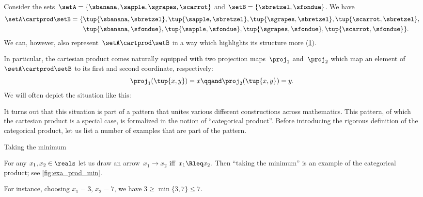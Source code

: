 \begin{example}
	Consider the sets~$\setA = \{\sbanana, \sapple, \sgrapes, \scarrot\}$ and $\setB = \{ \sbretzel, \sfondue \}$.
	We have
	\begin{equation}
		\label{eq:cart-prod-example}
		\begin{aligned}
			\setA \cartprod \setB = \{ & \tup{\sbanana, \sbretzel}, \tup{\sapple, \sbretzel}, \tup{\sgrapes, \sbretzel}, \tup{\scarrot, \sbretzel}, \\
			                           & \tup{\sbanana,\sfondue}, \tup{\sapple, \sfondue}, \tup{\sgrapes, \sfondue}, \tup{\scarrot, \sfondue} \}.
		\end{aligned}
	\end{equation}
	We can, however, also represent~$\setA \cartprod \setB$ in a way which highlights its structure more (\cref{fig:example_cartesian}).
	\begin{figure}[h]
		\centering
		\caption{}
		\label{fig:example_cartesian}
	\end{figure}
	In particular, the cartesian product comes naturally equipped with two projection maps~$\proj_1$ and~$\proj_2$ which map an element of~$\setA \cartprod \setB$ to its first and second coordinate, respectively:
	\begin{equation}
		\proj_1(\tup{x,y}) =  x  \qqand \proj_2(\tup{x,y}) = y.
	\end{equation}
	We will often depict the situation like this:
\end{example}
\begin{figure}[h!
	]
	\centering
	\caption{}
	\label{fig:diagram_cartesian_2}
\end{figure}

It turns out that this situation is part of a pattern that unites various different constructions across mathematics.
This pattern, of which the cartesian product is a special case, is formalized in the notion of ``categorical product''.
Before introducing the rigorous definition of the categorical product, let us list a number of examples that are part of the pattern.

\begin{marginfigure}
	\centering
	\caption{Taking the minimum}
	\label{fig:exa_prod_min}
\end{marginfigure}

\begin{example}
	\label{exa:min-as-prod}
	For any $x_1,x_2\in \reals$ let us draw an arrow~$x_1\to x_2$ iff~$x_1\Rleq x_2$.
	Then ``taking the minimum'' is an example of the categorical product; see \cref{fig:exa_prod_min}.

	For instance, choosing $x_1 = 3$, $x_2 = 7$, we have $3 \geq \min \{3, 7\} \leq 7$.
\end{example}

